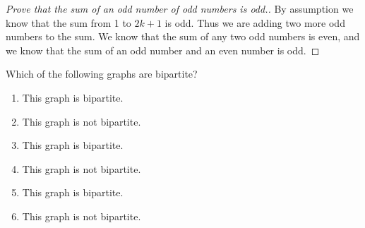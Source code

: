 \documentclass[12pt]{article}
\newenvironment{modenumerate}
  {\enumerate\setupmodenumerate}
  {\endenumerate}
\newif\ifmoditem
\newcommand{\setupmodenumerate}{%
  \global\moditemfalse
  \let\origmakelabel\makelabel
  \def\moditem##1{\global\moditemtrue\def\mesymbol{##1}\item}%
  \def\makelabel##1{%
    \origmakelabel{##1\ifmoditem\rlap{\mesymbol}\fi\enspace}%
    \global\moditemfalse}%
}
\begin{document}
\begin{modenumerate}
\begin{proof}[Prove that the sum of an odd number of odd numbers is odd.]
By assumption we know that the sum from 1 to $2k+1$ is odd. Thus we are adding two more odd numbers to the
sum. We know that the sum of any two odd numbers is even, and we know that the sum of an odd number and an
even number is odd.
\end{proof}
\setcounter{enumi}{36}
\item %
Which of the following graphs are bipartite?
\begin{enumerate}
\item This graph is bipartite.
\item This graph is not bipartite.
\item This graph is bipartite.
\item This graph is not bipartite.
\item This graph is bipartite.
\item This graph is not bipartite.
\end{enumerate}
\end{modenumerate}
\setcounter{section}{10}
\end{document}
